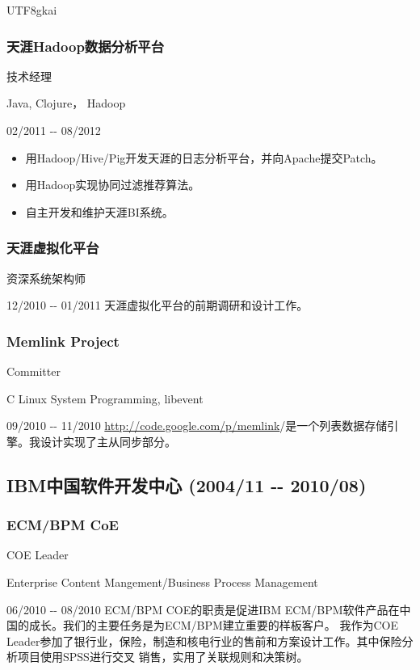 \documentclass[a4paper]{article}
\newenvironment{DUlineblock}[1]{%
    \list{}{\setlength{\partopsep}{\parskip}
            \addtolength{\partopsep}{\baselineskip}
            \setlength{\topsep}{0pt}
            \setlength{\itemsep}{0.15\baselineskip}
            \setlength{\parsep}{0pt}
            \setlength{\leftmargin}{#1}}
    \raggedright
  }
  {\endlist}
\begin{document}
\begin{CJK}{UTF8}{gkai}
\subsubsection*{天涯Hadoop数据分析平台}
\begin{DUlineblock}{0em}
\item[] 技术经理
\item[] Java, Clojure， Hadoop
\item[] 02/2011 -{}- 08/2012
\end{DUlineblock}
%
\begin{itemize}
\item 用Hadoop/Hive/Pig开发天涯的日志分析平台，并向Apache提交Patch。
\item 用Hadoop实现协同过滤推荐算法。
\item 自主开发和维护天涯BI系统。
\end{itemize}

\subsubsection*{天涯虚拟化平台}
\begin{DUlineblock}{0em}
\item[] 资深系统架构师
\item[] 12/2010 -{}- 01/2011
\end{DUlineblock}
天涯虚拟化平台的前期调研和设计工作。

\subsubsection*{Memlink Project}
\begin{DUlineblock}{0em}
\item[] Committer
\item[] C Linux System Programming, libevent
\item[] 09/2010 -{}- 11/2010
\end{DUlineblock}
\url{http://code.google.com/p/memlink}/是一个列表数据存储引擎。我设计实现了主从同步部分。

\subsection*{IBM中国软件开发中心 (2004/11 -{}- 2010/08)}

\subsubsection*{ECM/BPM CoE}
\begin{DUlineblock}{0em}
\item[] COE Leader
\item[] Enterprise Content Mangement/Business Process Management
\item[] 06/2010 -{}- 08/2010
\end{DUlineblock}
ECM/BPM COE的职责是促进IBM ECM/BPM软件产品在中国的成长。我们的主要任务是为ECM/BPM建立重要的样板客户。
我作为COE Leader参加了银行业，保险，制造和核电行业的售前和方案设计工作。其中保险分析项目使用SPSS进行交叉
销售，实用了关联规则和决策树。


\end{CJK}
\end{document}

